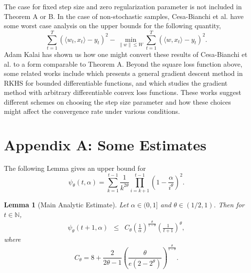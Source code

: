 \documentclass[twoside]{amsart}
\theoremstyle{theorem}
\newtheorem{lem}[thm]{Lemma}
\theoremstyle{definition}
\theoremstyle{remark}
\def\N{{\mathbb N}}
\def\<{{\langle}}
\def\>{{\rangle}}
\begin{document}
The case for fixed step size and zero regularization parameter is
not included in Theorem A or B. In the case of non-stochastic
samples, Cesa-Bianchi et al. \cite{CesLonWar96} have some worst case analysis on the upper bounds for the following quantity,
\[ \sum_{t=1}^T (\<w_t,x_t\>-y_t)^2 - \min_{\|w\|\leq W} \sum_{t=1}^T (\<w,x_t\>-y_t)^2. \]
Adam Kalai has shown us how one might convert these results of Cesa-Bianchi et al. to a form comparable to
Theorem A. Beyond the square loss function above, some related works include \cite{KivSmoWil04} which presents a general gradient descent method in RKHS for
bounded differentiable functions, and \cite{Zinkevich03} which studies the gradient method with arbitrary differentiable convex loss functions.
These works suggest different schemes on choosing the step size parameter and how these choices might affect the convergence rate under various conditions.

\vspace{2pc}



\section*{Appendix A: Some Estimates}


\renewcommand{\thesection}{A}
\setcounter{equation}{0}
\setcounter{thm}{0}
\renewcommand{\thethm}{A.\arabic{thm}}
\renewcommand{\theequation}{A-\arabic{equation}}

The following Lemma gives an upper bound for
\[ \psi_\theta(t,\alpha) = \sum_{k=1}^{t-1} \frac{1}{k^{2\theta}} \prod_{i=k+1}^{t-1} \left(1-\frac{\alpha}{i^{\theta}}\right)^2. \]

\begin{lem}[Main Analytic Estimate] \label{lem:main}
Let $\alpha\in (0,1]$ and $\theta\in (1/2,1)$. Then for $t\in \N$,
\begin{eqnarray*}
\psi_\theta(t+1,\alpha) & \leq &
C_\theta \left(\frac{1}{\alpha} \right)^{\frac{\theta}{1-\theta}} \left(\frac{1}{t+1}\right)^{\theta},
\end{eqnarray*}
where
\[ C_\theta = 8+\frac{2}{2\theta-1} \left(\frac{\theta}{e(2-2^\theta)}
\right)^{\frac{\theta}{1-\theta}}
 . \]
\end{lem}
\end{document}
